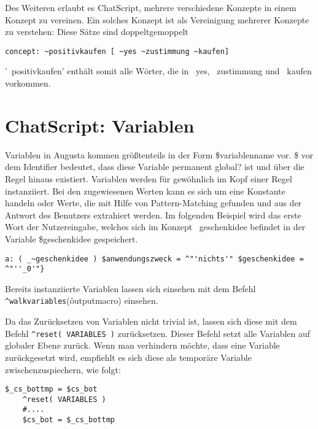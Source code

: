 \textcolor[rgb]{1,0.41,0.13}{Des Weiteren erlaubt es ChatScript, mehrere verschiedene Konzepte in einem Konzept zu vereinen. Ein solches Konzept ist als Vereinigung mehrerer Konzepte zu verstehen: Diese Sätze sind doppeltgemoppelt}

\begin{lstlisting}[caption={Konzept 'positivkaufen' aus konzepte.top}]
concept: ~positivkaufen [ ~yes ~zustimmung ~kaufen]
\end{lstlisting}

'~positivkaufen' enthält somit alle Wörter, die in ~yes, ~zustimmung und ~kaufen vorkommen. 

\section{ChatScript: Variablen}
\label{sec:ChatScript: Variablen}
Variablen in Augusta kommen größtenteils in der Form \$variablenname vor. \$ vor dem Identifier bedeutet, dass diese Variable permanent \textcolor[rgb]{1,0.41,0.13}{global?} ist und über die Regel hinaus existiert. Variablen werden für gewöhnlich im Kopf einer Regel instanziiert. Bei den zugewiesenen Werten kann es sich um eine Konstante handeln oder Werte, die mit Hilfe von Pattern-Matching gefunden und aus der Antwort des Benutzers extrahiert werden. Im folgenden Beispiel wird das erste Wort der Nutzereingabe, welches sich im Konzept ~geschenkidee befindet in der Variable \$geschenkidee gespeichert. 

\begin{lstlisting}[caption={Zuweisung des Wertes einer Variable }]
a: ( _~geschenkidee ) $anwendungszweck = ^"'nichts'" $geschenkidee = ^"''_0'"}
\end{lstlisting}

Bereits instanziierte Variablen lassen sich einsehen mit dem Befehl \lstinline|^walkvariables|(\^outputmacro) einsehen. 

Da das Zurücksetzen von Variablen nicht trivial ist, lassen sich diese mit dem Befehl \lstinline|^reset( VARIABLES )| zurücksetzen. Dieser Befehl setzt alle Variablen auf globaler Ebene zurück. Wenn man verhindern möchte, dass eine Variable zurückgesetzt wird, empfiehlt es sich diese als temporäre Variable zwischenzuspiechern, wie folgt:


\begin{lstlisting}[caption={Zwischenspeichern einer Variable}]
	$_cs_bottmp = $cs_bot
    ^reset( VARIABLES )
    #....
	$cs_bot = $_cs_bottmp 
\end{lstlisting}

